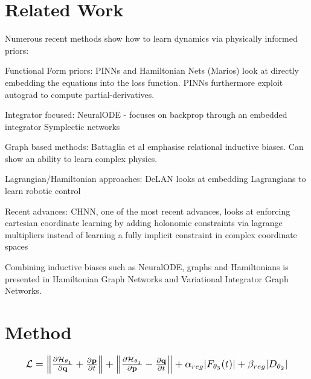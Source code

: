 \documentclass[twoside]{article}
\begin{document}
\section{Related Work}

Numerous recent methods show how to learn dynamics via physically informed priors:

Functional Form priors:
PINNs and Hamiltonian Nets (Marios) look at directly embedding the equations into the loss function. PINNs furthermore exploit autograd to compute partial-derivatives. 

Integrator focused:
NeuralODE - focuses on backprop through an embedded integrator
Symplectic networks


Graph based methods:
Battaglia et al emphasise relational inductive biases. Can show an ability to learn complex physics.

Lagrangian/Hamiltonian approaches:
DeLAN looks at embedding Lagrangians to learn robotic control

Recent advances:
CHNN, one of the most recent advances, looks at enforcing cartesian coordinate learning by adding holonomic constraints via lagrange multipliers instead of learning a fully implicit constraint in complex coordinate spaces


Combining inductive biases such as NeuralODE, graphs and Hamiltonians is presented in Hamiltonian Graph Networks and Variational Integrator Graph Networks.


\section{Method}

\begin{equation}
\resizebox{0.9\linewidth}{!}{$%
\mathcal{L} =\left\| \frac{\partial \mathcal{H}_{\theta_1}}{\partial \mathbf{q}} +  \frac{\partial \mathbf{p}}{\partial t} \right\| +\left\| \frac{\partial \mathcal{H}_{\theta_1}}{\partial \mathbf{p}} -  \frac{\partial \mathbf{q}}{\partial t} \right\|+ \alpha_{reg}| F_{\theta_3} (t)| + \beta_{reg}|D_{\theta_2}| 
$%
}
\end{equation}
\end{document}
